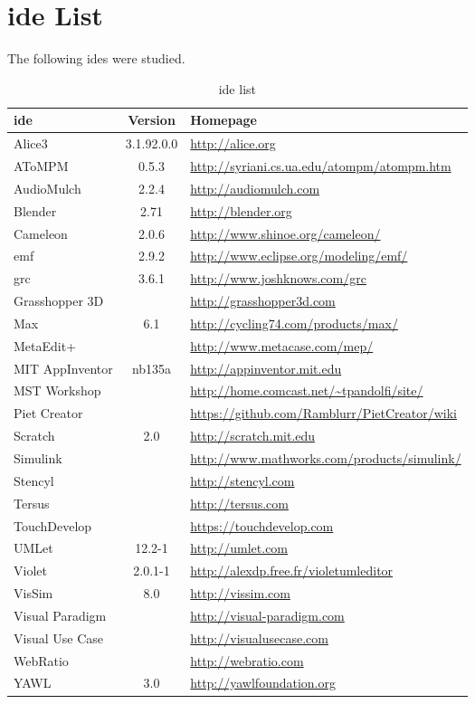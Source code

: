 \section{\acs{ide} List}
\label{sec:ide_list}

The following \acp{ide} were studied.

\noindent
\begin{table}[!htb]
\label{table:ides}
\begin{tabularx}{\textwidth}{@{}lcX@{}}
  \textbf{\ac{ide}} & \textbf{Version} & \textbf{Homepage} \\
  \hline
  Alice3 & 3.1.92.0.0 & \url{http://alice.org} \\
  AToMPM & 0.5.3 & \url{http://syriani.cs.ua.edu/atompm/atompm.htm} \\
  AudioMulch & 2.2.4 & \url{http://audiomulch.com} \\
  Blender & 2.71 & \url{http://blender.org} \\
  Cameleon & 2.0.6 & \url{http://www.shinoe.org/cameleon/} \\
  \ac{emf} & 2.9.2 & \url{http://www.eclipse.org/modeling/emf/} \\
  \ac{grc} & 3.6.1 & \url{http://www.joshknows.com/grc} \\
  Grasshopper 3D & & \url{http://grasshopper3d.com} \\
  Max & 6.1 & \url{http://cycling74.com/products/max/} \\
  MetaEdit+ & & \url{http://www.metacase.com/mep/} \\
  MIT AppInventor & nb135a & \url{http://appinventor.mit.edu} \\
  MST Workshop & & \url{http://home.comcast.net/~tpandolfi/site/} \\
  Piet Creator & & \url{https://github.com/Ramblurr/PietCreator/wiki} \\
  Scratch & 2.0 & \url{http://scratch.mit.edu} \\
  Simulink & & \url{http://www.mathworks.com/products/simulink/} \\
  Stencyl & & \url{http://stencyl.com} \\
  Tersus & & \url{http://tersus.com} \\
  TouchDevelop & & \url{https://touchdevelop.com} \\
  UMLet & 12.2-1 & \url{http://umlet.com} \\
  Violet & 2.0.1-1 & \url{http://alexdp.free.fr/violetumleditor} \\
  VisSim & 8.0 & \url{http://vissim.com} \\
  Visual Paradigm & & \url{http://visual-paradigm.com} \\
  Visual Use Case & & \url{http://visualusecase.com} \\
  WebRatio & & \url{http://webratio.com} \\
  YAWL & 3.0 & \url{http://yawlfoundation.org} \\
\end{tabularx}
\caption{\ac{ide} list}
\end{table}

